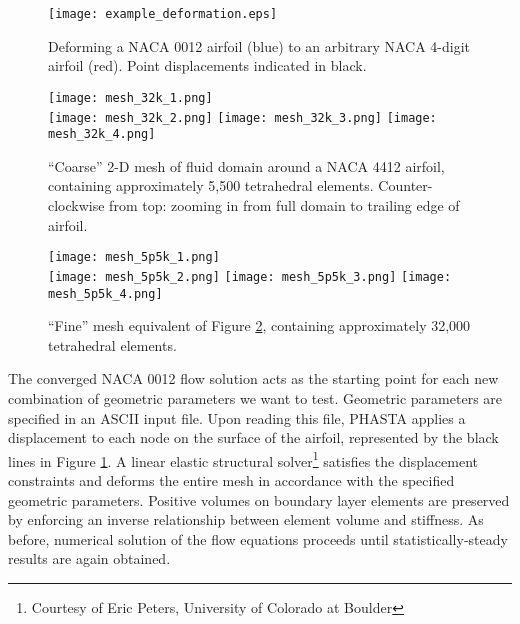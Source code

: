 \documentclass[11pt]{article}
\begin{document}
\begin{figure}[b]
\begin{center}
\texttt{[image: example\_deformation.eps]}
\caption{Deforming a NACA 0012 airfoil ({\color{blue}blue}) to an arbitrary NACA 4-digit airfoil ({\color{red}red}). Point displacements indicated in black.}
\label{fig:example_deformation}
\end{center}
\end{figure}

\begin{figure}[hb]
\begin{center}
\texttt{[image: mesh\_32k\_1.png]}
\\[1.5ex]
\texttt{[image: mesh\_32k\_2.png]}
\hspace*{1ex}
\texttt{[image: mesh\_32k\_3.png]}
\hspace*{1ex}
\texttt{[image: mesh\_32k\_4.png]}
\\[1.5ex]
\caption{``Coarse'' 2-D mesh of fluid domain around a NACA 4412 airfoil, containing approximately 5,500 tetrahedral elements. Counter-clockwise from top: zooming in from full domain to trailing edge of airfoil.}
\label{fig:mesh_fine}
\end{center}
\end{figure}

\begin{figure}[hb]
\begin{center}
\texttt{[image: mesh\_5p5k\_1.png]}
\\[1.5ex]
\texttt{[image: mesh\_5p5k\_2.png]}
\hspace*{1ex}
\texttt{[image: mesh\_5p5k\_3.png]}
\hspace*{1ex}
\texttt{[image: mesh\_5p5k\_4.png]}
\\[1.5ex]
\caption{``Fine'' mesh equivalent of Figure \ref{fig:mesh_fine}, containing approximately 32,000 tetrahedral elements.}
\label{fig:mesh_coarse}
\end{center}
\end{figure}

The converged NACA 0012 flow solution acts as the starting point for each new combination of geometric parameters we want to test. Geometric parameters are specified in an ASCII input file. Upon reading this file, PHASTA applies a displacement to each node on the surface of the airfoil, represented by the black lines in Figure \ref{fig:example_deformation}. A linear elastic structural solver\footnote{Courtesy of Eric Peters, University of Colorado at Boulder} satisfies the displacement constraints and deforms the entire mesh in accordance with the specified geometric parameters. Positive volumes on boundary layer elements are preserved by enforcing an inverse relationship between element volume and stiffness. As before, numerical solution of the flow equations proceeds until statistically-steady results are again obtained.
\end{document}
